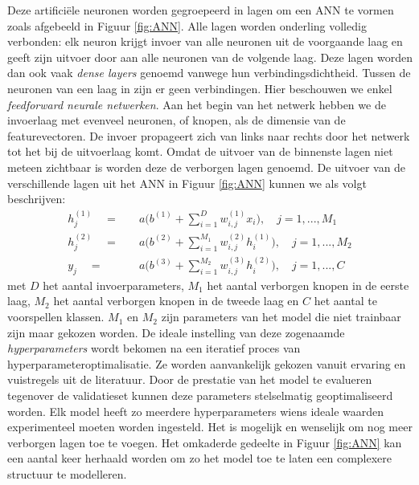 \npar Deze artifici\"ele neuronen worden gegroepeerd in lagen om een ANN te vormen zoals afgebeeld in Figuur \ref{fig:ANN}. Alle lagen worden onderling volledig verbonden: elk neuron krijgt invoer van alle neuronen uit de voorgaande laag en geeft zijn uitvoer door aan alle neuronen van de volgende laag. Deze lagen worden dan ook vaak \textit{dense layers} genoemd vanwege hun verbindingsdichtheid. Tussen de neuronen van een laag in zijn er geen verbindingen. 
\npar Hier beschouwen we enkel \textit{feedforward neurale netwerken}. Aan het begin van het netwerk hebben we de invoerlaag met evenveel neuronen, of knopen, als de dimensie van de featurevectoren. De invoer propageert zich van links naar rechts door het netwerk tot het bij de uitvoerlaag komt. Omdat de uitvoer van de binnenste lagen niet meteen zichtbaar is worden deze de verborgen lagen genoemd.
\npar De uitvoer van de verschillende lagen uit het ANN in Figuur \ref{fig:ANN} kunnen we als volgt beschrijven:
\begin{equation}
\begin{aligned}
h^{(1)}_j\quad=&\quad a\bigg(b^{(1)}+\sum_{i=1}^{D}w^{(1)}_{i,j}x_i\bigg),\quad j=1,...,M_1\\
h^{(2)}_j\quad=&\quad a\bigg(b^{(2)}+\sum_{i=1}^{M_1}w^{(2)}_{i,j}h^{(1)}_i\bigg),\quad j=1,...,M_2\\ 
y_j\quad=&\quad a\bigg(b^{(3)}+\sum_{i=1}^{M_2}w^{(3)}_{i,j}h^{(2)}_i\bigg),\quad j=1,...,C 
\end{aligned}
\end{equation}
met $D$ het aantal invoerparameters, $M_1$ het aantal verborgen knopen in de eerste laag, $M_2$ het aantal verborgen knopen in de tweede laag en $C$ het aantal te voorspellen klassen. $M_1$ en $M_2$ zijn parameters van het model die niet trainbaar zijn maar gekozen worden. De ideale instelling van deze zogenaamde \textit{hyperparameters} wordt bekomen na een iteratief proces van hyperparameteroptimalisatie. Ze worden aanvankelijk gekozen vanuit ervaring en vuistregels uit de literatuur. Door de prestatie van het model te evalueren tegenover de validatieset kunnen deze parameters stelselmatig geoptimaliseerd worden. Elk model heeft zo meerdere hyperparameters wiens ideale waarden experimenteel moeten worden ingesteld.
\npar Het is mogelijk en wenselijk om nog meer verborgen lagen toe te voegen. Het omkaderde gedeelte in Figuur \ref{fig:ANN} kan een aantal keer herhaald worden om zo het model toe te laten een complexere structuur te modelleren.

